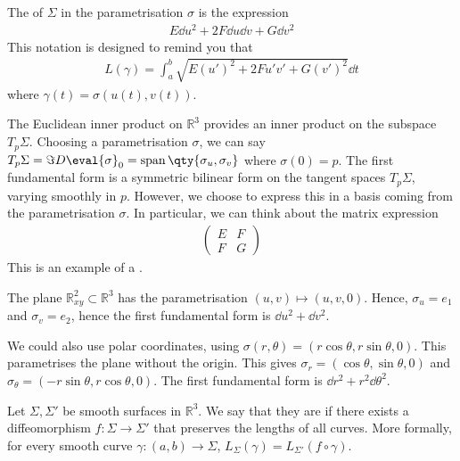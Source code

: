 \begin{definition}
	The  of $\Sigma$ in the parametrisation $\sigma$ is the expression
	\begin{align*}
		E \dd{u}^2 + 2F \dd{u} \dd{v} + G \dd{v}^2
	\end{align*}
	This notation is designed to remind you that
	\begin{align*}
		L(\gamma) = \int_a^b \sqrt{E (u')^2 + 2F u'v' + G (v')^2} \dd{t}
	\end{align*}
	where $\gamma(t) = \sigma(u(t),v(t))$.
\end{definition}

\begin{remark}
	The Euclidean inner product on $\mathbb R^3$ provides an inner product on the subspace $T_p \Sigma$.
	Choosing a parametrisation $\sigma$, we can say $T_p \Sigma = \Im D \eval{\sigma}_0 = \vecspan{\qty{\sigma_u, \sigma_v}}$ where $\sigma(0) = p$.
	The first fundamental form is a symmetric bilinear form on the tangent spaces $T_p \Sigma$, varying smoothly in $p$.
	However, we choose to express this in a basis coming from the parametrisation $\sigma$.
	In particular, we can think about the matrix expression
	\begin{align*}
		\begin{pmatrix}
			E & F \\
			F & G
		\end{pmatrix}
	\end{align*}
	This is an example of a .
\end{remark}

\begin{example}
	The plane $\mathbb R^2_{xy} \subset \mathbb R^3$ has the parametrisation $(u,v) \mapsto (u,v,0)$.
	Hence, $\sigma_u = e_1$ and $\sigma_v = e_2$, hence the first fundamental form is $\dd{u}^2 + \dd{v}^2$.

	We could also use polar coordinates, using $\sigma(r,\theta) = (r\cos\theta,r\sin\theta,0)$.
	This parametrises the plane without the origin.
	This gives $\sigma_r = (\cos\theta,\sin\theta,0)$ and $\sigma_\theta = (-r\sin\theta, r\cos\theta,0)$.
	The first fundamental form is $\dd{r}^2 + r^2 \dd{\theta}^2$.
\end{example}

\begin{definition}[Isometries]
	Let $\Sigma, \Sigma'$ be smooth surfaces in $\mathbb R^3$.
	We say that they are  if there exists a diffeomorphism $f\colon \Sigma \to \Sigma'$ that preserves the lengths of all curves.
	More formally, for every smooth curve $\gamma \colon (a,b) \to \Sigma$, $L_\Sigma(\gamma) = L_{\Sigma'}(f \circ \gamma)$.
\end{definition}

